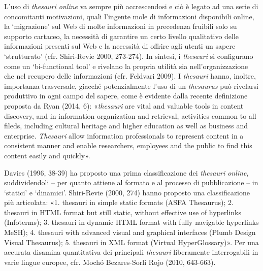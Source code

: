 L'uso di \emph{thesauri online} va sempre più accrescendosi e ciò è
legato ad una serie di concomitanti motivazioni, quali l'ingente mole di
informazioni disponibili online, la `migrazione' sul Web di molte
informazioni in precedenza fruibili solo su supporto cartaceo, la
necessità di garantire un certo livello qualitativo delle informazioni
presenti sul Web e la necessità di offrire agli utenti un sapere
`strutturato' (cfr. Shiri-Revie 2000, 273-274). In sintesi, i
\emph{thesauri} si configurano come un `bi-functional tool' e rivelano
la propria utilità sia nell'organizzazione che nel recupero delle
informazioni (cfr. Feldvari 2009). I \emph{thesauri} hanno, inoltre,
importanza trasversale, giacché potenzialmente l'uso di un
\emph{thesaurus} può rivelarsi produttivo in ogni campo del sapere, come
è evidente dalla recente definizione proposta da Ryan (2014, 6):
«\emph{thesauri} are vital and valuable tools in content discovery, and
in information organization and retrieval, activities common to all
fileds, including cultural heritage and higher education as well as
business and enterprise. \emph{Thesauri} allow information professionals
to represent content in a consistent manner and enable researchers,
employees and the public to find this content easily and quickly».

Davies (1996, 38-39) ha proposto una prima classificazione dei
\emph{thesauri online}, suddividendoli -- per quanto attiene al formato
e al processo di pubblicazione -- in `statici' e `dinamici'. Shiri-Revie
(2000, 274) hanno proposto una classificazione più articolata: «1.
thesauri in simple static formats (ASFA Thesaurus); 2. thesauri in HTML
format but still static, without effective use of hyperlinks
(Infoterms); 3. thesauri in dynamic HTML format with fully navigable
hyperlinks MeSH); 4. thesauri with advanced visual and graphical
interfaces (Plumb Design Visual Thesaurus); 5. thesauri in XML format
(Virtual HyperGlossary)». Per una accurata disamina quantitativa dei
principali \emph{thesauri} liberamente interrogabili in varie lingue
europee, cfr. Mochó Bezares-Sorli Rojo (2010, 643-663).

